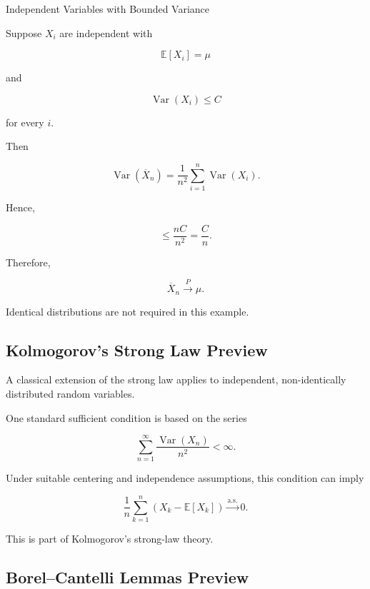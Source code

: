 \begin{workedexamplebox}{Independent Variables with Bounded Variance}

Suppose \(X_i\) are independent with

\[
\mathbb{E}[X_i]=\mu
\]

and

\[
\operatorname{Var}(X_i)\leq C
\]

for every \(i\).

Then

\[
\operatorname{Var}(\overline{X}_n)
=
\frac1{n^2}
\sum_{i=1}^{n}
\operatorname{Var}(X_i).
\]

Hence,

\[
\leq
\frac{nC}{n^2}
=
\frac{C}{n}.
\]

Therefore,

\begin{answerbox}
\[
\boxed{
\overline{X}_n
\xrightarrow{P}
\mu.
}
\]
\end{answerbox}

Identical distributions are not required in this example.

\end{workedexamplebox}

\subsection{Kolmogorov's Strong Law Preview}
\label{subsec:kolmogorov-strong-law-preview}

A classical extension of the strong law applies to independent,
non-identically distributed random variables.

One standard sufficient condition is based on the series

\[
\boxed{
\sum_{n=1}^{\infty}
\frac{
\operatorname{Var}(X_n)
}{
n^2
}
<
\infty.
}
\]

Under suitable centering and independence assumptions, this condition
can imply

\[
\boxed{
\frac1n
\sum_{k=1}^{n}
(X_k-\mathbb{E}[X_k])
\xrightarrow{\text{a.s.}}
0.
}
\]

This is part of Kolmogorov's strong-law theory.

\subsection{Borel--Cantelli Lemmas Preview}
\label{subsec:borel-cantelli-preview}

